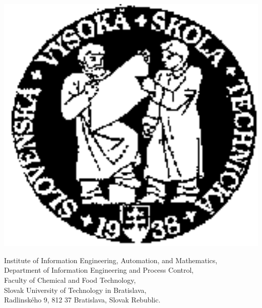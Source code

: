 \begin{minipage}[t]{1\linewidth}
  \vspace{0.1cm}
  \begin{minipage}[t]{0.78\linewidth}
    \vspace{0.1cm}
    \begin{minipage}[t]{0.165\linewidth}
      \vspace{0.1cm}
      \begin{flushleft}
        \includegraphics[width=1\textwidth]{pictures/logostu}
      \end{flushleft}
    \end{minipage}
    \begin{minipage}[t]{0.82\linewidth}
      \vspace{0.1cm}
      \begin{flushleft}
        {\footnotesize{
          \textcolor{black!80!white}{
            Institute of Information Engineering, Automation, and
            Mathematics,\\ 
            Department of Information Engineering and Process
            Control,\\ 
            Faculty of Chemical and Food Technology,\\
            Slovak University of Technology in Bratislava,\\
            Rad\-lin\-sk\'e\-ho 9, 812 37 Bratislava, Slovak Rebublic.
}}}
\end{flushleft}
\end{minipage}
\end{minipage}
\end{minipage}
